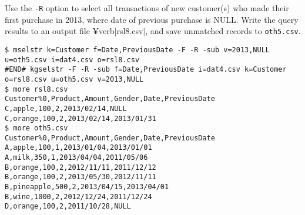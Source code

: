 Use the \verb|-R| option to select all transactions of new customer(s) who made their first purchase in 2013, where date of previous purchase is NULL.
Write the query results to an output file ¥verb|rsl8.csv|, and save unmatched records to \verb|oth5.csv|. 



\begin{Verbatim}[baselinestretch=0.7,frame=single]
$ mselstr k=Customer f=Date,PreviousDate -F -R -sub v=2013,NULL u=oth5.csv i=dat4.csv o=rsl8.csv
#END# kgselstr -F -R -sub f=Date,PreviousDate i=dat4.csv k=Customer o=rsl8.csv u=oth5.csv v=2013,NULL
$ more rsl8.csv
Customer%0,Product,Amount,Gender,Date,PreviousDate
C,apple,100,2,2013/02/14,NULL
C,orange,100,2,2013/02/14,2013/01/31
$ more oth5.csv
Customer%0,Product,Amount,Gender,Date,PreviousDate
A,apple,100,1,2013/01/04,2013/01/01
A,milk,350,1,2013/04/04,2011/05/06
B,orange,100,2,2012/11/11,2011/12/12
B,orange,100,2,2013/05/30,2012/11/11
B,pineapple,500,2,2013/04/15,2013/04/01
B,wine,1000,2,2012/12/24,2011/12/24
D,orange,100,2,2011/10/28,NULL
\end{Verbatim}
